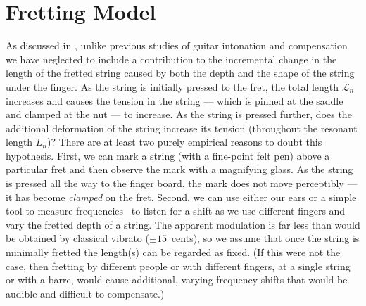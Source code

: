 %
%
%

 \section{Fretting Model\label{app:fret}}

As discussed in , unlike previous studies of guitar intonation and compensation~\cite{ref:byers1996cgi,ref:varieschi2010icf} we have neglected to include a contribution to the incremental change in the length of the fretted string caused by both the depth and the shape of the string under the finger. As the string is initially pressed to the fret, the total length $\mathcal{L}_n$ increases and causes the tension in the string --- which is pinned at the saddle and clamped at the nut --- to increase. As the string is pressed further, does the additional deformation of the string increase its tension (throughout the resonant length $L_n$)? There are at least two purely empirical reasons to doubt this hypothesis. First, we can mark a string (with a fine-point felt pen) above a particular fret and then observe the mark with a magnifying glass. As the string is pressed all the way to the finger board, the mark does not move perceptibly --- it has become \emph{clamped} on the fret. Second, we can use either our ears or a simple tool to measure frequencies~\cite{ref:pgtweb} to listen for a shift as we use different fingers and vary the fretted depth of a string. The apparent modulation is far less than would be obtained by classical vibrato ($\pm15$~cents), so we assume that once the string is minimally fretted the length(s) can be regarded as fixed. (If this were not the case, then fretting by different people or with different fingers, at a single string or with a barre, would cause additional, varying frequency shifts that would be audible and difficult to compensate.)


